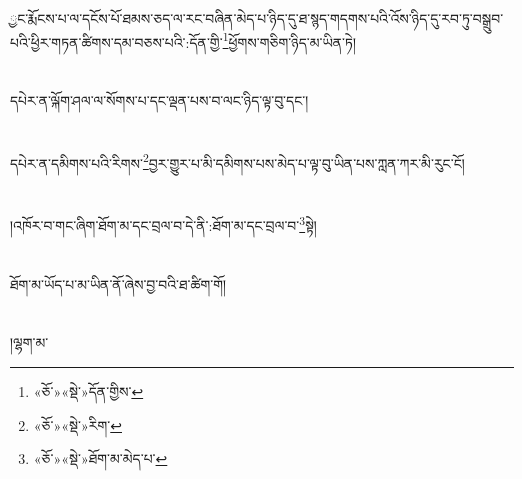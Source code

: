 ྱང་རྨོངས་པ་ལ་དངོས་པོ་ཐམས་ཅད་ལ་རང་བཞིན་མེད་པ་ཉིད་དུ་ཐ་སྙད་གདགས་པའི་འོས་ཉིད་དུ་རབ་ཏུ་བསྒྲུབ་པའི་ཕྱིར་གཏན་ཚིགས་དམ་བཅས་པའི་:དོན་གྱི་\footnote{«ཅོ་»«སྡེ་»དོན་གྱིས་}ཕྱོགས་གཅིག་ཉིད་མ་ཡིན་ཏེ།\chapter{ }དཔེར་ན་ལྐོག་ཤལ་ལ་སོགས་པ་དང་ལྡན་པས་བ་ལང་ཉིད་ལྟ་བུ་དང་།\chapter{ }དཔེར་ན་དམིགས་པའི་རིགས་\footnote{«ཅོ་»«སྡེ་»རིག་}བྱར་གྱུར་པ་མི་དམིགས་པས་མེད་པ་ལྟ་བུ་ཡིན་པས་ཀླན་ཀར་མི་རུང་ངོ།\chapter{ }།འཁོར་བ་གང་ཞིག་ཐོག་མ་དང་བྲལ་བ་དེ་ནི་:ཐོག་མ་དང་བྲལ་བ་\footnote{«ཅོ་»«སྡེ་»ཐོག་མ་མེད་པ་}སྟེ།\chapter{ }ཐོག་མ་ཡོད་པ་མ་ཡིན་ནོ་ཞེས་བྱ་བའི་ཐ་ཚིག་གོ།\chapter{ }།ལྷག་མ་